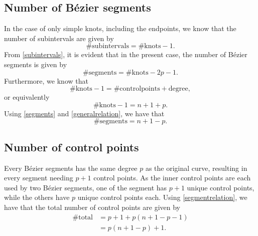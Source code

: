\documentclass[]{article}
\begin{document}
\subsection*{Number of B\'{e}zier segments}
In the case of only simple knots, including the endpoints, we know that the number of subintervals are given by \begin{equation}\label{subintervals}
\#\mathrm{subintervals} = \#\mathrm{knots} - 1.
\end{equation}
From \eqref{subintervals}, it is evident that in the present case, the number of B\'{e}zier segments is given by \begin{equation}\label{segments}
\#\mathrm{segments} = \#\mathrm{knots} - 2p - 1.
\end{equation}
Furthermore, we know that \begin{equation*}
\#\mathrm{knots} - 1 = \#\mathrm{controlpoints} + \mathrm{degree},
\end{equation*} 
or equivalently\begin{equation}\label{generalrelation}
\#\mathrm{knots} - 1 = n + 1 + p.
\end{equation}
Using \eqref{segments} and \eqref{generalrelation}, we have that \begin{equation}\label{segmentrelation}
\#\mathrm{segments} = n + 1 - p.
\end{equation}
\subsection*{Number of control points}
Every B\'{e}zier segments has the same degree $p$ as the original curve, resulting in every segment needing $p+1$ control points. As the inner control points are each used by two B\'{e}zier segments, one of the segment has $p+1$ unique control points, while the others have $p$ unique control points each. Using \eqref{segmentrelation}, we have that the total number of control points are given by\begin{equation*}
\begin{aligned}
\#\mathrm{total} &= p + 1 + p(n + 1 - p - 1)\\
&= p(n + 1 - p) + 1.
\end{aligned}
\end{equation*}
\end{document}

